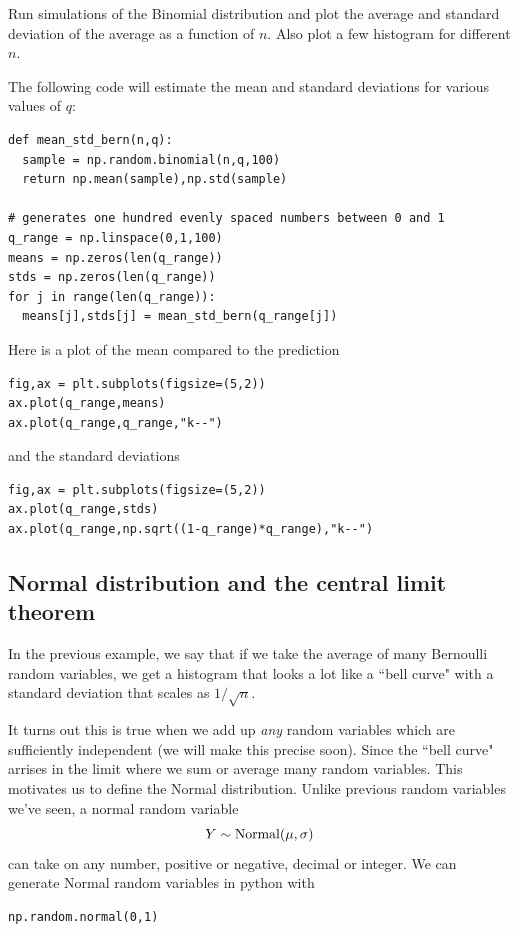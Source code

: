 \begin{exercise}
Run simulations of the Binomial distribution and plot the average and standard deviation of the average as a function of $n$. Also plot a few histogram for different $n$. 
\end{exercise}
\begin{solution}
The following code will estimate the mean and standard deviations for various values of $q$:
\begin{Verbatim}
def mean_std_bern(n,q):
  sample = np.random.binomial(n,q,100)
  return np.mean(sample),np.std(sample)

# generates one hundred evenly spaced numbers between 0 and 1
q_range = np.linspace(0,1,100)
means = np.zeros(len(q_range))
stds = np.zeros(len(q_range))
for j in range(len(q_range)):
  means[j],stds[j] = mean_std_bern(q_range[j])
\end{Verbatim}
Here is a plot of the mean compared to the prediction
\begin{Verbatim}
fig,ax = plt.subplots(figsize=(5,2))
ax.plot(q_range,means)
ax.plot(q_range,q_range,"k--")
\end{Verbatim}
and the standard deviations
\begin{Verbatim}
fig,ax = plt.subplots(figsize=(5,2))
ax.plot(q_range,stds)
ax.plot(q_range,np.sqrt((1-q_range)*q_range),"k--")
\end{Verbatim}
\end{solution}


\subsection{Normal distribution and the central limit theorem}

In the previous example, we say that if we take the average of many Bernoulli random variables, we get a histogram that looks a lot like a ``bell curve" with a standard deviation that scales as $1/\sqrt{n}$.

It turns out this is true when we add up \emph{any} random variables which are sufficiently independent (we will make this precise soon). Since the ``bell curve" arrises in the limit where we sum or average many random variables. This motivates us to define the Normal distribution. Unlike previous random variables we've seen, a normal random variable
\begin{equation}
Y \sim {\rm Normal}(\mu,\sigma)
\end{equation}
can take on any number, positive or negative, decimal or integer.
We can generate Normal random variables in python with
\begin{Verbatim}
np.random.normal(0,1)
\end{Verbatim}


